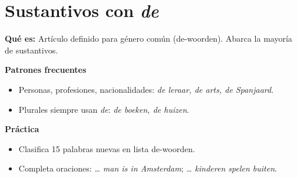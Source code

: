 \section{Sustantivos con \textit{de}}
\textbf{Qué es:} Artículo definido para género común (de-woorden). Abarca la mayoría de sustantivos.

\textbf{Patrones frecuentes}
\begin{itemize}[leftmargin=*]
  \item Personas, profesiones, nacionalidades: \textit{de leraar, de arts, de Spanjaard}.
  \item Plurales siempre usan \textit{de}: \textit{de boeken, de huizen}.
\end{itemize}

\textbf{Práctica}
\begin{itemize}[leftmargin=*]
  \item Clasifica 15 palabras nuevas en lista de-woorden.
  \item Completa oraciones: \textit{\ldots{} man is in Amsterdam}; \textit{\ldots{} kinderen spelen buiten}.
\end{itemize}
